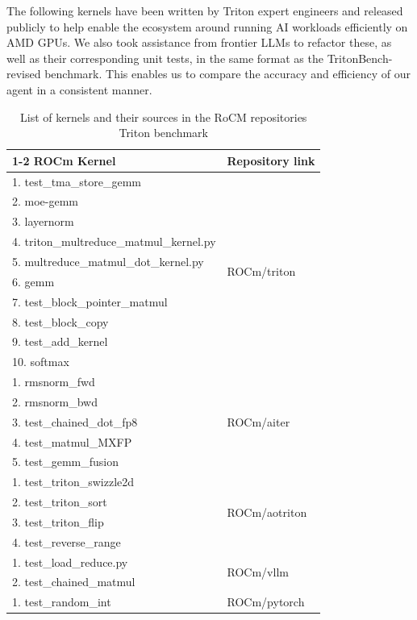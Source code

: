 

The following kernels have been written by Triton expert engineers and released publicly to help enable the ecosystem around running AI workloads efficiently on AMD GPUs. We also took assistance from frontier LLMs to refactor these, as well as their corresponding unit tests, in the same format as the TritonBench-revised benchmark. This enables us to compare the accuracy and efficiency of our agent in a consistent manner.

\begin{table}
 \caption{List of kernels and their sources in the RoCM repositories Triton benchmark}
  \centering
  \begin{tabular}{ll}
    \toprule
    \cmidrule(r){1-2}
    ROCm Kernel     & Repository link  \\
    \midrule
    1. test\_tma\_store\_gemm & \multirow{10}{*}{ROCm/triton }\\
    2. moe-gemm    &\\
    3. layernorm   &\\
    4. triton\_multreduce\_matmul\_kernel.py &\\
    5. multreduce\_matmul\_dot\_kernel.py    &\\
    6. gemm       &\\
    7. test\_block\_pointer\_matmul  &\\
    8. test\_block\_copy     &\\
    9. test\_add\_kernel   & \\
    10. softmax &\\
    \midrule
    1. rmsnorm\_fwd   &  \multirow{5}{*}{ROCm/aiter}\\
    2. rmsnorm\_bwd   & \\
    3. test\_chained\_dot\_fp8 &\\
    4. test\_matmul\_MXFP & \\
    5. test\_gemm\_fusion & \\
    \midrule
    1. test\_triton\_swizzle2d  &  \multirow{4}{*}{ROCm/aotriton}\\
    2. test\_triton\_sort &\\
    3. test\_triton\_flip &\\
    4. test\_reverse\_range &\\
    \midrule
    1. test\_load\_reduce.py & \multirow{2}{*}{ROCm/vllm} \\
    2. test\_chained\_matmul &\\
    \midrule
    1. test\_random\_int & \multirow{5}{*}{ROCm/pytorch}\\

\end{tabular}
\end{table}
